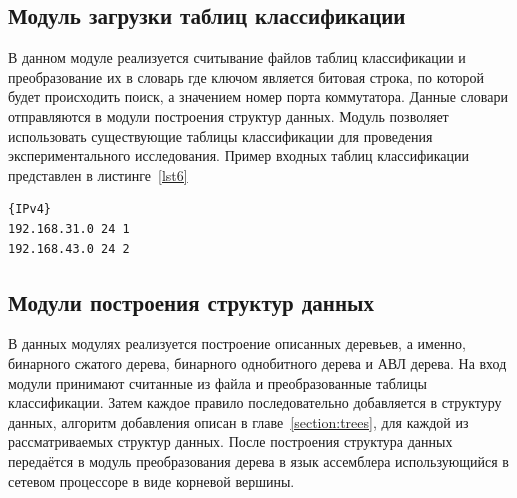 \documentclass[a4paper, 12pt, titlepage, finall]{extreport}
\begin{document}
        \subsection{Модуль загрузки таблиц классификации}
            \label{section:tablemod}
            В данном модуле реализуется считывание файлов таблиц классификации и преобразование их в словарь где ключом является битовая строка,
            по которой будет происходить поиск, а значением номер порта коммутатора. Данные словари отправляются в модули построения структур данных.
            Модуль позволяет использовать существующие таблицы классификации для проведения экспериментального исследования.
            Пример входных таблиц классификации представлен в листинге~\ref{lst6}\\
\begin{lstlisting}[frame=lines, caption=Пример таблиц классификации, label=lst6]
{IPv4}
192.168.31.0 24 1
192.168.43.0 24 2
\end{lstlisting}
        \subsection{Модули построения структур данных}
            В данных модулях реализуется построение описанных деревьев, а именно, бинарного сжатого дерева, бинарного однобитного дерева и АВЛ дерева.
            На вход модули принимают считанные из файла и преобразованные таблицы классификации.
            Затем каждое правило последовательно добавляется в структуру данных, алгоритм добавления описан в главе~\ref{section:trees}, для каждой из 
            рассматриваемых структур данных.
            После построения структура данных передаётся в модуль преобразования дерева в язык ассемблера использующийся в сетевом процессоре в виде корневой вершины.
            
\end{document}
